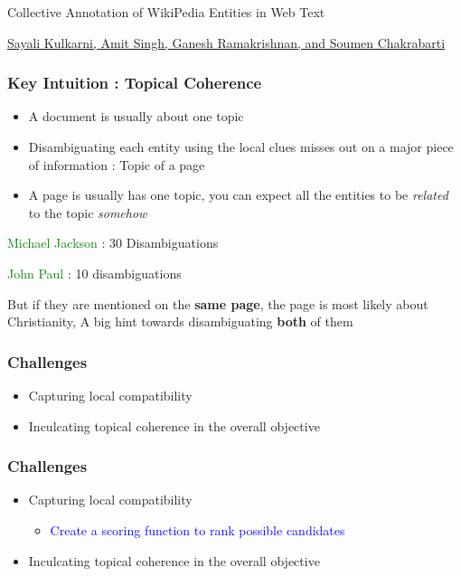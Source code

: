 
\begin{frame}
 \begin{center}
 
  Collective Annotation of WikiPedia Entities in Web Text 
  
  \bigskip
  
 \hyperref[thepaper]{ Sayali Kulkarni, Amit Singh, Ganesh Ramakrishnan, and Soumen Chakrabarti}
  \end{center}

\end{frame}

\begin{frame}
 \frametitle{Key Intuition : Topical Coherence}
 \begin{itemize}
  \item A document is usually about one topic \bigskip
  \item Disambiguating each entity using the local clues misses out on a major piece of information : Topic of a page \bigskip
  \item A page is usually has one topic, you can expect all the entities to be \emph{related} to the topic \emph{somehow} \bigskip
  \end{itemize}
  \textcolor{green}{Michael Jackson} : 30 Disambiguations 
  
 \textcolor{green}{John Paul} : 10 disambiguations 
 
 
 
  But if they are mentioned on the \textbf{same page}, the page is most likely about Christianity, A big hint towards disambiguating \textbf{both} of them
  
 
  \end{frame}
 
\begin{frame}
 \frametitle{Challenges}
 \begin{itemize}
  \item Capturing local compatibility \bigskip
  \item Inculcating topical coherence in the overall objective \bigskip
 \end{itemize}

\end{frame}

\begin{frame}
 \frametitle{Challenges}
 \begin{itemize}
  \item Capturing local compatibility
  \begin{itemize}
   \item \textcolor{blue}{Create a scoring function to rank possible candidates}
  \end{itemize}

  \item Inculcating topical coherence in the overall objective
 \end{itemize}

\end{frame}


